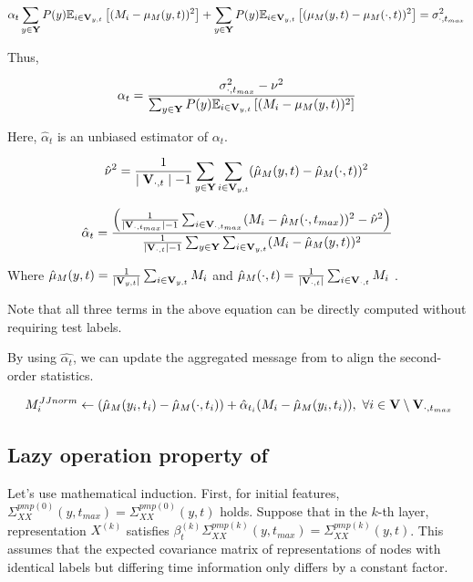 \begin{align}
\alpha_t\sum_{y\in \bold{Y}}P(y)\mathbb{E}_{i\in \bold{V}_{y,t}}\left[ (M_i - \mu_M(y,t))^2 \right] +\sum_{y\in \bold{Y}}P(y)\mathbb{E}_{i\in \bold{V}_{y,t}}\left[(\mu_M(y,t)-\mu_M(\cdot,t))^2 \right] =\sigma_{\cdot,t_{max}}^2 
\end{align}

Thus,

\begin{align}
\alpha_t = { \sigma_{\cdot,t_{max}}^2  - \nu^2\over\sum_{y\in \bold{Y}}P(y)\mathbb{E}_{i\in \bold{V}_{y,t}}\left[ (M_i- \mu_M(y,t))^2 \right]}
\end{align}

Here, $\hat{\alpha}_t$ is an unbiased estimator of $\alpha_t$.

\begin{align}
\hat{\nu}^2={1\over \mid{\bold{V}_{\cdot,t}}\mid-1} \sum_{y\in \bold{Y}}\sum_{i \in \bold{V}_{y,t}}(\hat\mu_M(y,t) -\hat\mu_M(\cdot,t) )^2  
\end{align}


\begin{align}
\hat{\alpha}_t = {\left( {1\over \mid{\bold{V}_{\cdot,t_{max}}}\mid-1}\sum_{i\in \bold{V}_{\cdot,t_{max}}}(M_i-\hat\mu_M(\cdot,t_{max}))^2  -\hat{\nu}^2 \right)\over{1\over \mid{\bold{V}_{\cdot,t}}\mid-1} \sum_{y\in\bold{Y}} \sum_{i \in \bold{V}_{y,t}}(M_i-\hat\mu_M(y,t))^2}
\end{align}

Where $\hat\mu_M(y,t)={1\over {\mid \bold{V}_{y,t} \mid}}\sum_{i\in \bold{V}_{y,t}}M_i$  and $\hat\mu_M(\cdot,t) ={1\over {\mid \bold{V}_{\cdot,t} \mid}}\sum_{i\in \bold{V}_{\cdot,t}}M_i$ . 

Note that all three terms in the above equation can be directly computed without requiring test labels.

By using $\hat{\alpha_t}$, we can update the aggregated message from \PMP to align the second-order statistics.

\begin{align}
\ M_i^{JJnorm} \leftarrow (\hat\mu_M(y_i,t_i) -\hat\mu_M(\cdot,t_i) )+\hat{\alpha}_{t_i} (M_i - \hat\mu_M(y_i,t_i)),\ \forall i \in \bold{V}\setminus\bold{V}_{\cdot,t_{max}}
\end{align}








\subsection{Lazy operation property of \JJnorm}
\label{apdx:Lazy}
Let's use mathematical induction. First, for initial features, $\Sigma_{XX}^{pmp (0)}(y,t_{max})= \Sigma_{XX}^{pmp (0)}(y,t)$ holds. Suppose that in the $k$-th layer, representation $X^{(k)}$ satisfies $\beta_{t}^{(k)}\Sigma_{XX}^{pmp (k)}(y,t_{max})= \Sigma_{XX}^{pmp (k)}(y,t)$. This assumes that the expected covariance matrix of representations of nodes with identical labels but differing time information only differs by a constant factor.

